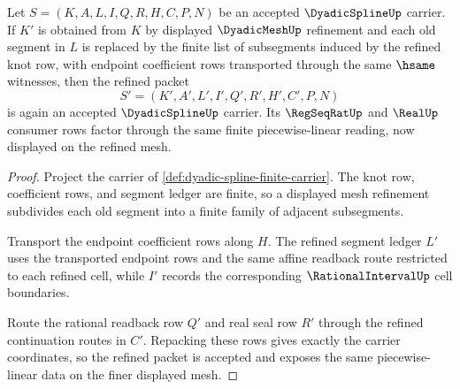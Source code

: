 \begin{theorem}
\label{thm:dyadic-spline-mesh-refinement-handoff}
Let $S=(K,A,L,I,Q,R,H,C,P,N)$ be an accepted $\DyadicSplineUp$ carrier. If $K'$ is obtained from $K$ by displayed $\DyadicMeshUp$ refinement and each old segment in $L$ is replaced by the finite list of subsegments induced by the refined knot row, with endpoint coefficient rows transported through the same $\hsame$ witnesses, then the refined packet
$$
S'=(K',A',L',I',Q',R',H',C',P,N)
$$
is again an accepted $\DyadicSplineUp$ carrier. Its $\RegSeqRatUp$ and $\RealUp$ consumer rows factor through the same finite piecewise-linear reading, now displayed on the refined mesh.
\end{theorem}
\begin{proof}
Project the carrier of \autoref{def:dyadic-spline-finite-carrier}. The knot row, coefficient rows, and segment ledger are finite, so a displayed mesh refinement subdivides each old segment into a finite family of adjacent subsegments.

Transport the endpoint coefficient rows along $H$. The refined segment ledger $L'$ uses the transported endpoint rows and the same affine readback route restricted to each refined cell, while $I'$ records the corresponding $\RationalIntervalUp$ cell boundaries.

Route the rational readback row $Q'$ and real seal row $R'$ through the refined continuation routes in $C'$. Repacking these rows gives exactly the carrier coordinates, so the refined packet is accepted and exposes the same piecewise-linear data on the finer displayed mesh.
\end{proof}

